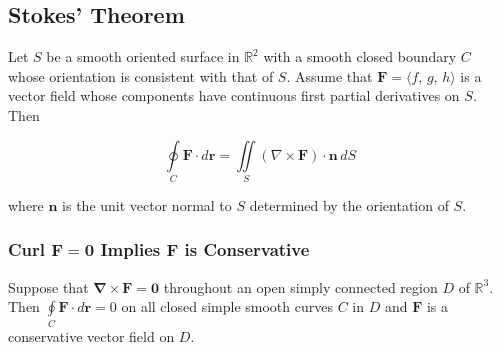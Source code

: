 \subsection{Stokes' Theorem}
Let $S$ be a smooth oriented surface in $\mathbb{R}^2$ with a smooth closed boundary $C$ whose orientation is consistent with that of $S$. Assume that $\mathbf{F} = \langle f,\, g,\, h \rangle$ is a vector field whose components have continuous first partial derivatives on $S$. Then

\begin{equation}
    \oint \limits _C \textbf{F} \cdot d \mathbf{r} = \iint \limits _S \left( \nabla \times \textbf{F} \right) \cdot \mathbf{n}\, dS
\end{equation}

\noindent where $\mathbf{n}$ is the unit vector normal to $S$ determined by the orientation of $S$.

\subsubsection{Curl $\mathbf{F = 0}$ Implies $\mathbf{F}$ is Conservative}
Suppose that $\mathbf{\nabla \times F = 0}$ throughout an open simply connected region $D$ of $\mathbb{R}^3$. Then $\oint \limits _C \mathbf{F} \cdot d\mathbf{r} = 0$ on all closed simple smooth curves $C$ in $D$ and $\mathbf{F}$ is a conservative vector field on $D$.
